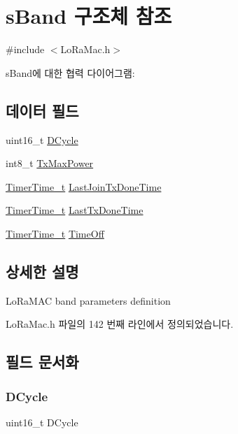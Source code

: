 \hypertarget{structs_band}{}\section{s\+Band 구조체 참조}
\label{structs_band}


{\ttfamily \#include $<$Lo\+Ra\+Mac.\+h$>$}



s\+Band에 대한 협력 다이어그램\+:
\subsection*{데이터 필드}
\begin{DoxyCompactItemize}
\item 
uint16\+\_\+t \mbox{\hyperlink{structs_band_a9ab2dfbcbe5e7e43c95ff6a436886139}{D\+Cycle}}
\item 
int8\+\_\+t \mbox{\hyperlink{structs_band_a1b9d27384fedab3a94167b8e9bf9b432}{Tx\+Max\+Power}}
\item 
\mbox{\hyperlink{utilities_8h_a4215ca43d3e953099ea758ce428599d0}{Timer\+Time\+\_\+t}} \mbox{\hyperlink{structs_band_a0e59dea87537a3d472a44694fc2be894}{Last\+Join\+Tx\+Done\+Time}}
\item 
\mbox{\hyperlink{utilities_8h_a4215ca43d3e953099ea758ce428599d0}{Timer\+Time\+\_\+t}} \mbox{\hyperlink{structs_band_a7316dfb002c4e0015fceeb727020fe5c}{Last\+Tx\+Done\+Time}}
\item 
\mbox{\hyperlink{utilities_8h_a4215ca43d3e953099ea758ce428599d0}{Timer\+Time\+\_\+t}} \mbox{\hyperlink{structs_band_a4de67f0652eb4259907c41ea8056c318}{Time\+Off}}
\end{DoxyCompactItemize}


\subsection{상세한 설명}
Lo\+Ra\+M\+AC band parameters definition 

Lo\+Ra\+Mac.\+h 파일의 142 번째 라인에서 정의되었습니다.



\subsection{필드 문서화}
\mbox{\label{structs_band_a9ab2dfbcbe5e7e43c95ff6a436886139}} 
\subsubsection{\texorpdfstring{D\+Cycle}{DCycle}}
{\footnotesize\ttfamily uint16\+\_\+t D\+Cycle}

